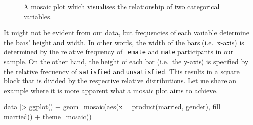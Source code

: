 \documentclass[
  letterpaper,
]{krantz}
\makeatletter
\newenvironment{Shaded}{\begin{snugshade}}{\end{snugshade}}
\newcommand{\AttributeTok}[1]{\textcolor[rgb]{0.40,0.45,0.13}{#1}}
\newcommand{\FunctionTok}[1]{\textcolor[rgb]{0.28,0.35,0.67}{#1}}
\newcommand{\NormalTok}[1]{\textcolor[rgb]{0.00,0.23,0.31}{#1}}
\newcommand{\SpecialCharTok}[1]{\textcolor[rgb]{0.37,0.37,0.37}{#1}}
\newenvironment{kframe}{%
\medskip{}
\setlength{\fboxsep}{.8em}
 \def\at@end@of@kframe{}%
 \ifinner\ifhmode%
  \def\at@end@of@kframe{\end{minipage}}%
  \begin{minipage}{\columnwidth}%
 \fi\fi%
 \def\FrameCommand##1{\hskip\@totalleftmargin \hskip-\fboxsep
 \colorbox{shadecolor}{##1}\hskip-\fboxsep
     \hskip-\linewidth \hskip-\@totalleftmargin \hskip\columnwidth}%
 \MakeFramed {\advance\hsize-\width
   \@totalleftmargin\z@ \linewidth\hsize
   \@setminipage}}%
 {\par\unskip\endMakeFramed%
 \at@end@of@kframe}
\renewenvironment{Shaded}{\begin{kframe}}{\end{kframe}}
\makeatother
\begin{document}
\begin{figure}[H]


\caption{\label{fig-mosaic-plot}A mosaic plot which visualises the
relationship of two categorical variables.}

\end{figure}%

It might not be evident from our data, but frequencies of each variable
determine the bars' height and width. In other words, the width of the
bars (i.e.~x-axis) is determined by the relative frequency of
\texttt{female} and \texttt{male} participants in our sample. On the
other hand, the height of each bar (i.e.~the y-axis) is specified by the
relative frequency of \texttt{satisfied} and \texttt{unsatisfied}. This
results in a square block that is divided by the respective relative
distributions. Let me share an example where it is more apparent what a
mosaic plot aims to achieve.

\begin{Shaded}
\begin{Highlighting}[]
\NormalTok{data }\SpecialCharTok{|\textgreater{}}
  \FunctionTok{ggplot}\NormalTok{() }\SpecialCharTok{+}
  \FunctionTok{geom\_mosaic}\NormalTok{(}\FunctionTok{aes}\NormalTok{(}\AttributeTok{x =} \FunctionTok{product}\NormalTok{(married, gender),}
                  \AttributeTok{fill =}\NormalTok{ married)) }\SpecialCharTok{+}
  \FunctionTok{theme\_mosaic}\NormalTok{()}
\end{Highlighting}
\end{Shaded}
\end{document}
